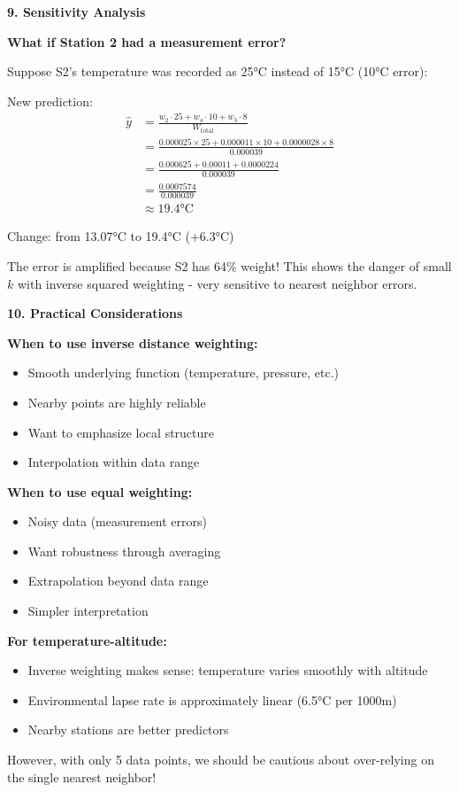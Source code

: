 \documentclass[12pt]{article}
\begin{document}
\begin{explanation}
\textbf{9. Sensitivity Analysis}

\textbf{What if Station 2 had a measurement error?}

Suppose S2's temperature was recorded as 25°C instead of 15°C (10°C error):

New prediction:
\begin{align*}
\hat{y} &= \frac{w_2 \cdot 25 + w_4 \cdot 10 + w_3 \cdot 8}{W_{\text{total}}} \\
&= \frac{0.000025 \times 25 + 0.000011 \times 10 + 0.0000028 \times 8}{0.000039} \\
&= \frac{0.000625 + 0.00011 + 0.0000224}{0.000039} \\
&= \frac{0.0007574}{0.000039} \\
&\approx 19.4°\text{C}
\end{align*}

Change: from 13.07°C to 19.4°C (+6.3°C)

The error is amplified because S2 has 64\% weight! This shows the danger of small \(k\) with inverse squared weighting - very sensitive to nearest neighbor errors.

\textbf{10. Practical Considerations}

\textbf{When to use inverse distance weighting:}
\begin{itemize}
    \item Smooth underlying function (temperature, pressure, etc.)
    \item Nearby points are highly reliable
    \item Want to emphasize local structure
    \item Interpolation within data range
\end{itemize}

\textbf{When to use equal weighting:}
\begin{itemize}
    \item Noisy data (measurement errors)
    \item Want robustness through averaging
    \item Extrapolation beyond data range
    \item Simpler interpretation
\end{itemize}

\textbf{For temperature-altitude:}
\begin{itemize}
    \item Inverse weighting makes sense: temperature varies smoothly with altitude
    \item Environmental lapse rate is approximately linear (6.5°C per 1000m)
    \item Nearby stations are better predictors
\end{itemize}

However, with only 5 data points, we should be cautious about over-relying on the single nearest neighbor!
\end{explanation}
\end{document}
